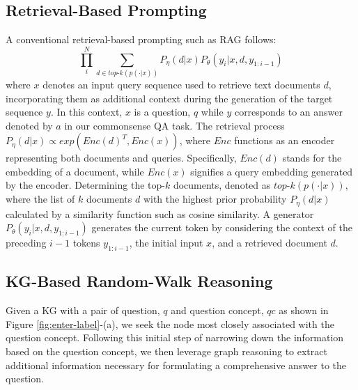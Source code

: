 \documentclass{article}
\begin{document}
\subsection{Retrieval-Based Prompting}  \label{3_2}
A conventional retrieval-based prompting such as RAG follows:
{\small
\begin{equation}\label{eq1}
\prod_{i}^{N}\sum_{d \in top\text{-}k(p(\cdot|x))}P_\eta(d|x)P_\theta(y_i|x,d,y_{1:i-1})
\end{equation}
}
where $x$ denotes an input query sequence used to retrieve text documents $d$, incorporating them as additional context during the generation of the target sequence $y$. In this context, $x$ is a question, $q$ while $y$ corresponds to an answer denoted by $a$ in our commonsense QA task. The retrieval process $P_\eta(d|x) \propto exp(Enc(d)^T, Enc(x))$, where $Enc$ functions as an encoder representing both documents and queries. Specifically, $Enc(d)$ stands for the embedding of a document, while $Enc(x)$ signifies a query embedding generated by the encoder. Determining the top-$k$ documents, denoted as $top\text{-}k(p(\cdot|x))$, where the list of $k$ documents $d$ with the highest prior probability $P_\eta(d|x)$ calculated by a similarity function such as cosine similarity. A generator $P_\theta(y_i|x, d, y_{1:i-1})$ generates the current token by considering the context of the preceding $i-1$ tokens $y_{1:i-1}$, the initial input $x$, and a retrieved document $d$.

\subsection{KG-Based Random-Walk Reasoning}
Given a KG with a pair of question, $q$ and question concept, $qc$ as shown in Figure \ref{fig:enter-label}-(a), we seek the node most closely associated with the question concept. Following this initial step of narrowing down the information based on the question concept, we then leverage graph reasoning to extract additional information necessary for formulating a comprehensive answer to the question.
\end{document}
